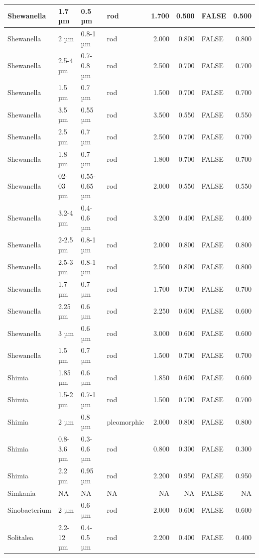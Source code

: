 \documentclass[
]{article}
\begin{document}
\begin{table}
\begin{tabular}{l|l|l|l|r|r|l|r}
\hline
Shewanella & 1.7 µm & 0.5 µm & rod & 1.700 & 0.500 & FALSE & 0.500\\
\hline
Shewanella & 2 µm & 0.8-1 µm & rod & 2.000 & 0.800 & FALSE & 0.800\\
\hline
Shewanella & 2.5-4 µm & 0.7-0.8 µm & rod & 2.500 & 0.700 & FALSE & 0.700\\
\hline
Shewanella & 1.5 µm & 0.7 µm & rod & 1.500 & 0.700 & FALSE & 0.700\\
\hline
Shewanella & 3.5 µm & 0.55 µm & rod & 3.500 & 0.550 & FALSE & 0.550\\
\hline
Shewanella & 2.5 µm & 0.7 µm & rod & 2.500 & 0.700 & FALSE & 0.700\\
\hline
Shewanella & 1.8 µm & 0.7 µm & rod & 1.800 & 0.700 & FALSE & 0.700\\
\hline
Shewanella & 02-03 µm & 0.55-0.65 µm & rod & 2.000 & 0.550 & FALSE & 0.550\\
\hline
Shewanella & 3.2-4 µm & 0.4-0.6 µm & rod & 3.200 & 0.400 & FALSE & 0.400\\
\hline
Shewanella & 2-2.5 µm & 0.8-1 µm & rod & 2.000 & 0.800 & FALSE & 0.800\\
\hline
Shewanella & 2.5-3 µm & 0.8-1 µm & rod & 2.500 & 0.800 & FALSE & 0.800\\
\hline
Shewanella & 1.7 µm & 0.7 µm & rod & 1.700 & 0.700 & FALSE & 0.700\\
\hline
Shewanella & 2.25 µm & 0.6 µm & rod & 2.250 & 0.600 & FALSE & 0.600\\
\hline
Shewanella & 3 µm & 0.6 µm & rod & 3.000 & 0.600 & FALSE & 0.600\\
\hline
Shewanella & 1.5 µm & 0.7 µm & rod & 1.500 & 0.700 & FALSE & 0.700\\
\hline
Shimia & 1.85 µm & 0.6 µm & rod & 1.850 & 0.600 & FALSE & 0.600\\
\hline
Shimia & 1.5-2 µm & 0.7-1 µm & rod & 1.500 & 0.700 & FALSE & 0.700\\
\hline
Shimia & 2 µm & 0.8 µm & pleomorphic & 2.000 & 0.800 & FALSE & 0.800\\
\hline
Shimia & 0.8-3.6 µm & 0.3-0.6 µm & rod & 0.800 & 0.300 & FALSE & 0.300\\
\hline
Shimia & 2.2 µm & 0.95 µm & rod & 2.200 & 0.950 & FALSE & 0.950\\
\hline
Simkania & NA & NA & NA & NA & NA & FALSE & NA\\
\hline
Sinobacterium & 2 µm & 0.6 µm & rod & 2.000 & 0.600 & FALSE & 0.600\\
\hline
Solitalea & 2.2-12 µm & 0.4-0.5 µm & rod & 2.200 & 0.400 & FALSE & 0.400\\

\end{tabular}
\end{table}
\end{document}
